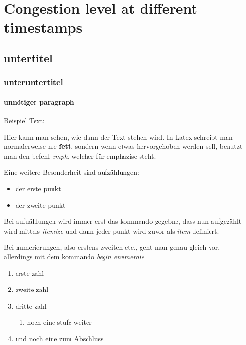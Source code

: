 %
\section{Congestion level at different timestamps} %
%

\subsection{untertitel}
\subsubsection{unteruntertitel}
\paragraph{unnötiger paragraph}

Beispiel Text:

Hier kann man sehen, wie dann der Text stehen wird. In Latex schreibt man normalerweise nie \textbf{fett}, sondern wenn etwas hervorgehoben werden soll, benutzt man den befehl \emph{emph}, welcher für emphazise steht.

Eine weitere Besonderheit sind aufzählungen:
\begin{itemize}
    \item der erste punkt
    \item der zweite punkt
\end{itemize}


Bei aufuählungen wird immer erst das kommando gegebne, dass nun aufgezählt wird mittels \emph{itemize} und dann jeder punkt wird zuvor als \emph{item} definiert. 

Bei numerierungen, also erstens zweiten etc., geht man genau gleich vor, allerdings mit dem kommando \emph{begin enumerate}

\begin{enumerate}
    \item erste zahl
    \item zweite zahl
    \item dritte zahl
    \begin{enumerate}
        \item noch eine stufe weiter
    \end{enumerate}
    \item und noch eine zum Abschluss
\end{enumerate}

